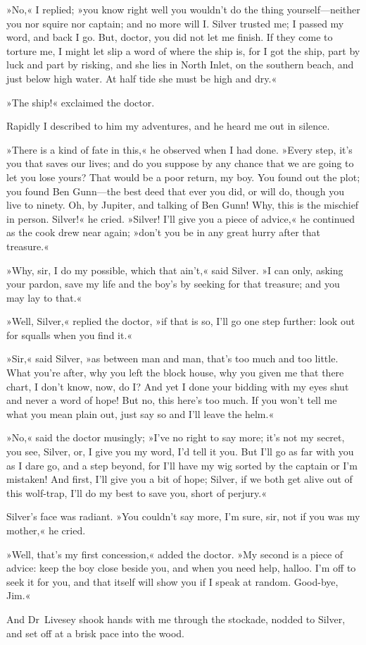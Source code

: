 »No,« I replied; »you know right well you wouldn't do the thing yourself—neither you nor squire nor captain; and no more will I. Silver trusted me; I passed my word, and back I go. But, doctor, you did not let me finish. If they come to torture me, I might let slip a word of where the ship is, for I got the ship, part by luck and part by risking, and she lies in North Inlet, on the southern beach, and just below high water. At half tide she must be high and dry.«

»The ship!« exclaimed the doctor.

Rapidly I described to him my adventures, and he heard me out in silence.

»There is a kind of fate in this,« he observed when I had done. »Every step, it's you that saves our lives; and do you suppose by any chance that we are going to let you lose yours? That would be a poor return, my boy. You found out the plot; you found Ben Gunn—the best deed that ever you did, or will do, though you live to ninety. Oh, by Jupiter, and talking of Ben Gunn! Why, this is the mischief in person. Silver!« he cried. »Silver! I'll give you a piece of advice,« he continued as the cook drew near again; »don't you be in any great hurry after that treasure.«

»Why, sir, I do my possible, which that ain't,« said Silver. »I can only, asking your pardon, save my life and the boy's by seeking for that treasure; and you may lay to that.«

»Well, Silver,« replied the doctor, »if that is so, I'll go one step further: look out for squalls when you find it.«

»Sir,« said Silver, »as between man and man, that's too much and too little. What you're after, why you left the block house, why you given me that there chart, I don't know, now, do I? And yet I done your bidding with my eyes shut and never a word of hope! But no, this here's too much. If you won't tell me what you mean plain out, just say so and I'll leave the helm.«

»No,« said the doctor musingly; »I've no right to say more; it's not my secret, you see, Silver, or, I give you my word, I'd tell it you. But I'll go as far with you as I dare go, and a step beyond, for I'll have my wig sorted by the captain or I'm mistaken! And first, I'll give you a bit of hope; Silver, if we both get alive out of this wolf-trap, I'll do my best to save you, short of perjury.«

Silver's face was radiant. »You couldn't say more, I'm sure, sir, not if you was my mother,« he cried.

»Well, that's my first concession,« added the doctor. »My second is a piece of advice: keep the boy close beside you, and when you need help, halloo. I'm off to seek it for you, and that itself will show you if I speak at random. Good-bye, Jim.«

And Dr~Livesey shook hands with me through the stockade, nodded to Silver, and set off at a brisk pace into the wood.